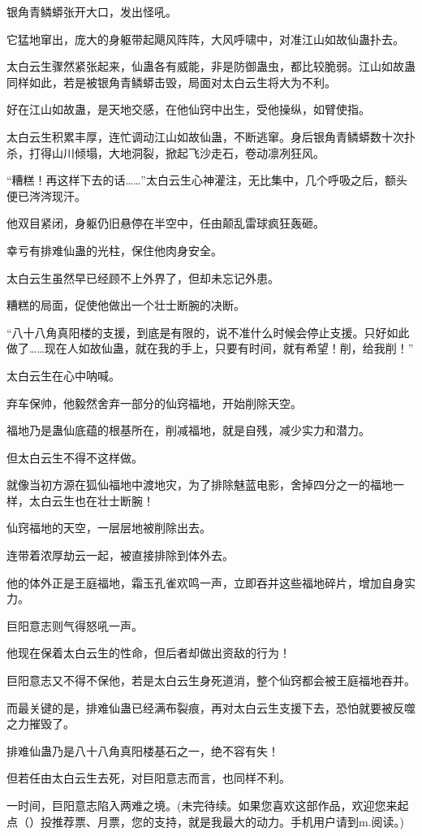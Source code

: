 \begin{this_body}
银角青鳞蟒张开大口，发出怪吼。

它猛地窜出，庞大的身躯带起飓风阵阵，大风呼啸中，对准江山如故仙蛊扑去。

太白云生骤然紧张起来，仙蛊各有威能，非是防御蛊虫，都比较脆弱。江山如故蛊同样如此，若是被银角青鳞蟒击毁，局面对太白云生将大为不利。

好在江山如故蛊，是天地交感，在他仙窍中出生，受他操纵，如臂使指。

太白云生积累丰厚，连忙调动江山如故仙蛊，不断逃窜。身后银角青鳞蟒数十次扑杀，打得山川倾塌，大地洞裂，掀起飞沙走石，卷动凛冽狂风。

“糟糕！再这样下去的话……”太白云生心神灌注，无比集中，几个呼吸之后，额头便已涔涔现汗。

他双目紧闭，身躯仍旧悬停在半空中，任由颠乱雷球疯狂轰砸。

幸亏有排难仙蛊的光柱，保住他肉身安全。

太白云生虽然早已经顾不上外界了，但却未忘记外患。

糟糕的局面，促使他做出一个壮士断腕的决断。

“八十八角真阳楼的支援，到底是有限的，说不准什么时候会停止支援。只好如此做了……现在人如故仙蛊，就在我的手上，只要有时间，就有希望！削，给我削！”

太白云生在心中呐喊。

弃车保帅，他毅然舍弃一部分的仙窍福地，开始削除天空。

福地乃是蛊仙底蕴的根基所在，削减福地，就是自残，减少实力和潜力。

但太白云生不得不这样做。

就像当初方源在狐仙福地中渡地灾，为了排除魅蓝电影，舍掉四分之一的福地一样，太白云生也在壮士断腕！

仙窍福地的天空，一层层地被削除出去。

连带着浓厚劫云一起，被直接排除到体外去。

他的体外正是王庭福地，霜玉孔雀欢鸣一声，立即吞并这些福地碎片，增加自身实力。

巨阳意志则气得怒吼一声。

他现在保着太白云生的性命，但后者却做出资敌的行为！

巨阳意志又不得不保他，若是太白云生身死道消，整个仙窍都会被王庭福地吞并。

而最关键的是，排难仙蛊已经满布裂痕，再对太白云生支援下去，恐怕就要被反噬之力摧毁了。

排难仙蛊乃是八十八角真阳楼基石之一，绝不容有失！

但若任由太白云生去死，对巨阳意志而言，也同样不利。

一时间，巨阳意志陷入两难之境。(未完待续。如果您喜欢这部作品，欢迎您来起点（）投推荐票、月票，您的支持，就是我最大的动力。手机用户请到m.阅读。)

\end{this_body}

